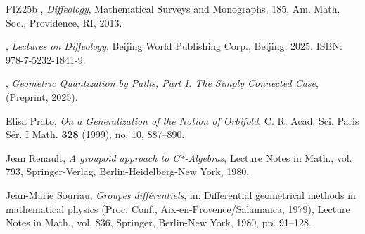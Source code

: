 \documentclass[10pt,reqno,letterpaper,twoside]{amsart}
\theoremstyle{article}
\begin{document}
\begin{thebibliography}{PIZ25b}
    \bysame,
    \emph{Diffeology},
    Mathematical Surveys and Monographs, 185, Am. Math. Soc., Providence, RI, 2013.
    
    \bysame,
    \emph{Lectures on Diffeology},
    Beijing World Publishing Corp., Beijing, 2025. ISBN: 978-7-5232-1841-9.
    
    \bysame,
    \emph{Geometric Quantization by Paths, Part I: The Simply Connected Case},
    (Preprint, 2025).
    
    Elisa Prato,
    \emph{On a Generalization of the Notion of Orbifold},
    C. R. Acad. Sci. Paris Sér. I Math. \textbf{328} (1999), no. 10, 887--890.
    
    Jean Renault,
    \emph{A groupoid approach to C*-Algebras},
    Lecture Notes in Math., vol. 793, Springer-Verlag, Berlin-Heidelberg-New York, 1980.
    
    Jean-Marie Souriau,
    \emph{Groupes différentiels},
    in: Differential geometrical methods in mathematical physics (Proc. Conf., Aix-en-Provence/Salamanca, 1979), Lecture Notes in Math., vol. 836, Springer, Berlin-New York, 1980, pp. 91--128.
    
  \end{thebibliography}
  
\end{document}
